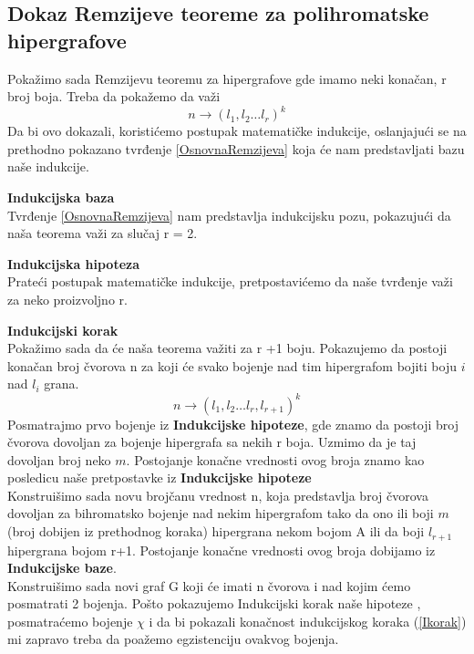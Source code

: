 \documentclass[a4paper]{article}
\begin{document}
	\subsection{Dokaz Remzijeve teoreme za polihromatske hipergrafove}
	Pokažimo sada Remzijevu teoremu za hipergrafove gde imamo neki konačan, r broj boja. Treba da pokažemo da važi 
	\begin{equation}
		n \rightarrow (l_1, l_2 \dots l_r)^k
	\end{equation}
	Da bi ovo dokazali, koristićemo postupak matematičke indukcije, oslanjajući se na prethodno pokazano tvrđenje \ref{OsnovnaRemzijeva} koja će nam predstavljati bazu naše indukcije.
	\begin{description}
		\item \textbf{Indukcijska baza} \\
		Tvrđenje \ref{OsnovnaRemzijeva} nam predstavlja indukcijsku pozu, pokazujući da naša teorema važi za slučaj r = 2.\\
		\item \textbf{Indukcijska hipoteza}\\
		Prateći postupak matematičke indukcije, pretpostavićemo da naše tvrđenje važi za neko proizvoljno r.\\
		\item \textbf{Indukcijski korak}\\
		Pokažimo sada da će naša teorema važiti za r +1 boju.
		Pokazujemo da postoji konačan broj čvorova n za koji će svako bojenje nad tim hipergrafom bojiti boju $i$ nad $l_i$ grana. %
		\begin{equation}\label{Ikorak}
		 n \rightarrow (l_1, l_2 \dots l_r, l_{r+1})^k
		\end{equation}
		Posmatrajmo prvo bojenje iz \textbf{Indukcijske hipoteze}, gde znamo da postoji broj čvorova dovoljan za bojenje hipergrafa sa nekih r boja. Uzmimo da je taj dovoljan broj neko $m$. Postojanje konačne vrednosti ovog broja znamo kao posledicu naše pretpostavke iz \textbf{Indukcijske hipoteze}\\
		Konstruišimo sada novu brojčanu vrednost n, koja predstavlja broj čvorova dovoljan za bihromatsko bojenje nad nekim hipergrafom tako da ono ili boji $m$ (broj dobijen iz prethodnog koraka) hipergrana nekom bojom A ili da boji $l_{r+1}$ hipergrana bojom r+1. Postojanje konačne vrednosti ovog broja dobijamo iz \textbf{Indukcijske baze}. 
		\\
		Konstruišimo sada novi graf G koji će imati n čvorova i nad kojim ćemo posmatrati 2 bojenja. Pošto pokazujemo Indukcijski korak naše hipoteze , posmatraćemo bojenje $\chi$ i da bi pokazali konačnost indukcijskog koraka (\ref{Ikorak}) mi zapravo treba da poažemo egzistenciju ovakvog bojenja.

\end{description}
\end{document}
